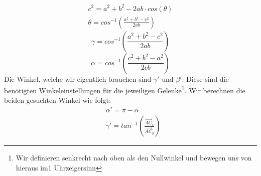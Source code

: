 \begin{equation}
	\begin{split}
		c^2=a^2+b^2-2ab \cdot cos(\theta)\\
		\theta=cos^{-1}\left(\frac{a^2+b^2-c^2}{2ab}\right)
	\end{split}
\end{equation}
\begin{equation*}
	\gamma=cos^{-1}\left(\frac{a^2+b^2-c^2}{2ab}\right)
\end{equation*}
\begin{equation*}
	\alpha=cos^{-1}\left(\frac{c^2+b^2-a^2}{2cb}\right)
\end{equation*}
Die Winkel, welche wir eigentlich brauchen sind $\gamma'$ und $\beta'$. Diese sind die benötigten Winkeleinstellungen für die jeweiligen Gelenke\footnote{Wir definieren senkrecht nach oben als den Nullwinkel und bewegen uns von hieraus im1 Uhrzeigersinn}. Wir berechnen die beiden gesuchten Winkel wie folgt:
\begin{align*}
	&\alpha' = \pi - \alpha \\
	&\gamma' = tan^{-1}\left(\frac{\vec{AC}_x}{\vec{AC}_y}\right)
\end{align*}
%
